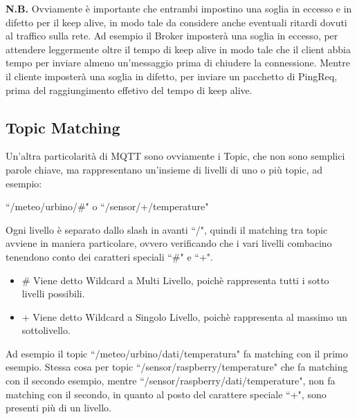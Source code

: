 \documentclass{article}
\begin{document}
\textbf{N.B.} Ovviamente è importante che entrambi impostino una soglia in eccesso e in difetto per il keep alive, in modo tale da considere anche eventuali ritardi dovuti al traffico sulla rete. Ad esempio il Broker imposterà una soglia in eccesso, per attendere leggermente oltre il tempo di keep alive in modo tale che il client abbia tempo per inviare almeno un'messaggio prima di chiudere la connessione. Mentre il cliente imposterà una soglia in difetto, per inviare un pacchetto di PingReq, prima del raggiungimento effetivo del tempo di keep alive.

\subsection{Topic Matching}
Un'altra particolarità di MQTT sono ovviamente i Topic, che non sono semplici parole chiave, ma rappresentano un'insieme di livelli di uno o più topic, ad esempio:
\begin{center}
	``/meteo/urbino/\#" o ``/sensor/+/temperature"
\end{center}

Ogni livello è separato dallo slash in avanti ``/", quindi il matching tra topic avviene in maniera particolare, ovvero verificando che i vari livelli combacino tenendono conto dei caratteri speciali ``\#" e ``+".
\begin{itemize}
	\item \# Viene detto Wildcard a Multi Livello, poichè rappresenta tutti i sotto livelli possibili.
	\item + Viene detto Wildcard a Singolo Livello, poichè rappresenta al massimo un sottolivello.
\end{itemize}
Ad esempio il topic ``/meteo/urbino/dati/temperatura" fa matching con il primo esempio. Stessa cosa per topic ``/sensor/raspberry/temperature" che fa matching con il secondo esempio, mentre ``/sensor/raspberry/dati/temperature", non fa matching con il secondo, in quanto al posto del carattere speciale ``+", sono presenti più di un livello.
\end{document}

